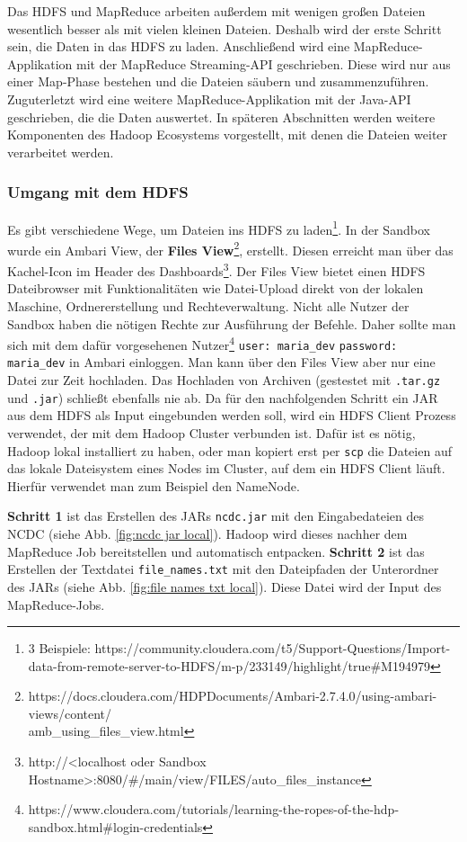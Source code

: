 Das HDFS und MapReduce arbeiten außerdem mit wenigen großen Dateien wesentlich besser als mit vielen kleinen Dateien.\cite[\textit{(S. 19-30, 693-695)}]{white_hadoop_2015} Deshalb wird der erste Schritt sein, die Daten in das HDFS zu laden. Anschließend wird eine MapReduce-Applikation mit der MapReduce Streaming-API geschrieben. Diese wird nur aus einer Map-Phase bestehen und die Dateien säubern und zusammenzuführen. Zuguterletzt wird eine weitere MapReduce-Applikation mit der Java-API geschrieben, die die Daten auswertet. In späteren Abschnitten werden weitere Komponenten des Hadoop Ecosystems vorgestellt, mit denen die Dateien weiter verarbeitet werden.
\subsubsection*{Umgang mit dem HDFS}
\label{chap:fund sec:core sub:handson hdfs}
Es gibt verschiedene Wege, um Dateien ins HDFS zu laden\footnote{3 Beispiele: https://community.cloudera.com/t5/Support-Questions/Import-data-from-remote-server-to-HDFS/m-p/233149/highlight/true\#M194979}. In der Sandbox wurde ein Ambari View, der \textbf{Files View}\footnote{https://docs.cloudera.com/HDPDocuments/Ambari-2.7.4.0/using-ambari-views/content/\\amb\_using\_files\_view.html}, erstellt. Diesen erreicht man über das Kachel-Icon im Header des Dashboards\footnote{http://<localhost oder Sandbox Hostname>:8080/\#/main/view/FILES/auto\_files\_instance}. Der Files View bietet einen HDFS Dateibrowser mit Funktionalitäten wie Datei-Upload direkt von der lokalen Maschine, Ordnererstellung und Rechteverwaltung. Nicht alle Nutzer der Sandbox haben die nötigen Rechte zur Ausführung der Befehle. Daher sollte man sich mit dem dafür vorgesehenen Nutzer\footnote{https://www.cloudera.com/tutorials/learning-the-ropes-of-the-hdp-sandbox.html\#login-credentials} \verb|user: maria_dev| \verb|password: maria_dev| in Ambari einloggen. Man kann über den Files View aber nur eine Datei zur Zeit hochladen. Das Hochladen von Archiven (gestestet mit \verb|.tar.gz| und \verb|.jar|) schließt ebenfalls nie ab. Da für den nachfolgenden Schritt ein JAR aus dem HDFS als Input eingebunden werden soll, wird ein HDFS Client Prozess verwendet, der mit dem Hadoop Cluster verbunden ist. Dafür ist es nötig, Hadoop lokal installiert zu haben, oder man kopiert erst per \verb|scp| die Dateien auf das lokale Dateisystem eines Nodes im Cluster, auf dem ein HDFS Client läuft. Hierfür verwendet man zum Beispiel den NameNode. 
\par
\textbf{Schritt 1} ist das Erstellen des JARs \verb|ncdc.jar| mit den Eingabedateien des NCDC (siehe Abb. \ref{fig:ncdc jar local}). Hadoop wird dieses nachher dem MapReduce Job bereitstellen und automatisch entpacken. \textbf{Schritt 2} ist das Erstellen der Textdatei \verb|file_names.txt| mit den Dateipfaden der Unterordner des JARs (siehe Abb. \ref{fig:file names txt local}). Diese Datei wird der Input des MapReduce-Jobs. 

